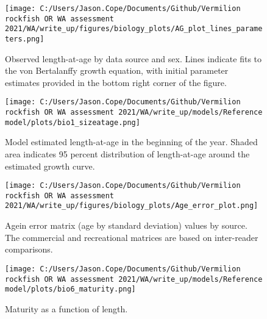 \documentclass[11pt,
  english,
  a4paper,
]{article}
\begin{document}
\begin{figure}
\centering
\texttt{[image: C:/Users/Jason.Cope/Documents/Github/Vermilion rockfish OR WA assessment 2021/WA/write\_up/figures/biology\_plots/AG\_plot\_lines\_parameters.png]}
\caption{Observed length-at-age by data source and sex. Lines indicate fits to the von Bertalanffy growth equation, with initial parameter estimates provided in the bottom right corner of the figure.\label{fig:len-age-data}}
\end{figure}

\tagmcend\tagstructend


\begin{figure}
\centering
\texttt{[image: C:/Users/Jason.Cope/Documents/Github/Vermilion rockfish OR WA assessment 2021/WA/write\_up/models/Reference model/plots/bio1\_sizeatage.png]}
\caption{Model estimated length-at-age in the beginning of the year. Shaded area indicates 95 percent distribution of length-at-age around the estimated growth curve.\label{fig:len-age-ss}}
\end{figure}

\tagmcend\tagstructend


\begin{figure}
\centering
\texttt{[image: C:/Users/Jason.Cope/Documents/Github/Vermilion rockfish OR WA assessment 2021/WA/write\_up/figures/biology\_plots/Age\_error\_plot.png]}
\caption{Agein error matrix (age by standard deviation) values by source. The commercial and recreational matrices are based on inter-reader comparisons.\label{fig:age-error}}
\end{figure}

\tagmcend\tagstructend


\begin{figure}
\centering
\texttt{[image: C:/Users/Jason.Cope/Documents/Github/Vermilion rockfish OR WA assessment 2021/WA/write\_up/models/Reference model/plots/bio6\_maturity.png]}
\caption{Maturity as a function of length.\label{fig:maturity}}
\end{figure}
\end{document}
